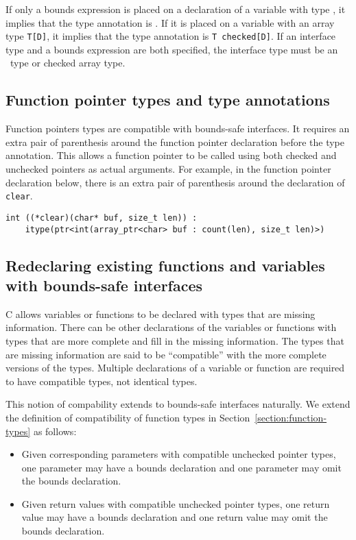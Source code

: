If only a bounds expression is placed on a declaration of a variable with type ,
it implies that the type annotation is .   If it is placed on a variable with an
array type \lstinline{T[D]}, it implies that the type annotation is \lstinline{T checked[D]}.   If
an interface type and a bounds expression are both specified, the interface type must
be an \arrayptr\ type or checked array type.

\subsection{Function pointer types and type annotations}
Function pointers types are compatible with bounds-safe interfaces.  It requires
an extra pair of parenthesis around the function pointer declaration before the type annotation.
This allows a function pointer to be called using both checked and unchecked
pointers as actual arguments.  For example, in the function pointer declaration
below, there is an extra pair of parenthesis around the declaration of
\lstinline+clear+.
\begin{lstlisting}
int ((*clear)(char* buf, size_t len)) :
    itype(ptr<int(array_ptr<char> buf : count(len), size_t len)>)
\end{lstlisting}

\subsection{Redeclaring existing functions and variables with bounds-safe interfaces}
\label{section:bounds-safe-interface-redeclaration}

C allows variables or functions to be declared with types that are missing information.
There can be other declarations of the variables or functions with types that are more complete
and fill in the missing information.  The types that are missing information are said to be
``compatible'' with the more complete versions of the types.  Multiple declarations of
a variable or function are required to have compatible types, not identical types.

This notion of compability extends to bounds-safe interfaces naturally.  We extend the
definition of compatibility of function types in Section~\ref{section:function-types} as follows:
\begin{itemize}
\item Given corresponding parameters with compatible unchecked pointer types,
one parameter may have a bounds declaration and one parameter may omit the bounds declaration.
\item Given return values with compatible unchecked pointer types, one
return value may have a bounds declaration and one return value may omit the bounds declaration.
\end{itemize}

